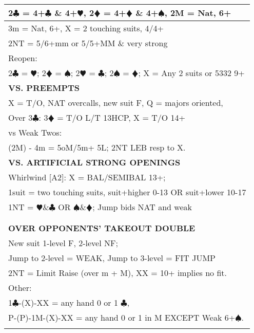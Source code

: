 \documentclass{article}
\newcommand\C{\ensuremath{\clubsuit}}
\newcommand\D{\color{red}\ensuremath{\vardiamondsuit}}
\renewcommand\H{\color{red}\ensuremath{\varheartsuit}}
\renewcommand\S{\ensuremath{\spadesuit}}
\newcommand\N{{\footnotesize NT}}
\newcommand\X{{\footnotesize X}}
\newcommand\XX{{\footnotesize XX}}
\begin{document}
{\begin{minipage}{90mm}
\begin{tabular}{| p{88mm} |}
		2{\C} = 4+{\C} \& 4+{\H}, 2{\D} = 4+{\D} \& 4+{\S}, 2M = Nat, 6+\\ \hline
		3m = Nat, 6+, X = 2 touching suits, 4/4+\\ \hline
		2{\N} = 5/6+mm or 5/5+MM \& very strong \\ \hline
		Reopen:\\ \hline
		2{\C} = {\H}; 2{\D} = {\S}; 2{\H} = {\C}; 2{\S} = {\D}; X = Any 2 suits or 5332 9+\\ \hline
		\cellcolor{orange!25}\textbf{VS. PREEMPTS} \\ \hline
		X = T/O, NAT overcalls, new suit F, Q = majors oriented,\\ \hline
		Over 3{\C}: 3{\D} = T/O L/T 13HCP, X = T/O 14+\\ \hline
		vs Weak Twos:\\ \hline
		(2M) - 4m = 5oM/5m+ 5L; 2NT LEB resp to X.\\ \hline
		\cellcolor{orange!25}\textbf{VS. ARTIFICIAL STRONG OPENINGS} \\ \hline
		Whirlwind [A2]: X = BAL/SEMIBAL 13+; \\ \hline
		1suit = two touching suits,  suit+higher 0-13 OR suit+lower 10-17\\ \hline
		1{\N} = {\H}\&{\C} OR {\S}\&{\D}; Jump bids NAT and weak\\ \hline
		\\ \hline
		\\ \hline
		\cellcolor{orange!25}\textbf{OVER OPPONENTS' TAKEOUT DOUBLE} \\ \hline
		New suit 1-level F, 2-level NF;\\ \hline
		Jump to 2-level = WEAK, Jump to 3-level = FIT JUMP\\ \hline
		2{\N} = Limit Raise (over m + M), XX = 10+ implies no fit.\\ \hline
		Other:\\ \hline
		1{\C}-(\X)-{\XX} = any hand 0 or 1 {\C},\\ \hline
		P-(P)-1M-(\X)-{\XX} = any hand 0 or 1 in M EXCEPT Weak 6+{\S}.\\ \hline
		\\ \hline
	\end{tabular}
\end{minipage}
}
\begin{minipage}{5mm}
	\begin{tabular}{| p{5mm} |}
	\end{tabular}
\end{minipage}
\end{document}
